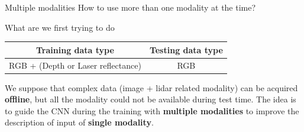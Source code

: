 \begin{frame}{Multiple modalities}
	How to use more than one modality at the time?
	\vfill
	\begin{block}{What are we first trying to do}
		\centering
		\begin{tabular}{c | c}
			\textbf{Training data type} & \textbf{Testing data type} \\
			\hline
			RGB + (Depth or Laser reflectance)  & RGB  \\
		\end{tabular}
	\end{block}
	\vfill
	We suppose that complex data (image + lidar related modality) can be acquired \textbf{offline}, but all the modality could not be available during test time. The idea is to guide the CNN during the training with \textbf{multiple modalities} to improve the description of input of \textbf{single modality}.
\end{frame}



